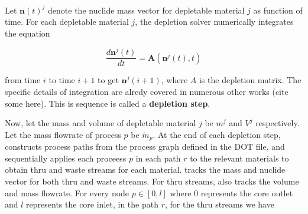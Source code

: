 Let $\mathbf{n}(t)^{j}$ denote the nuclide mass vector for depletable material
$j$ as function of time. For each depletable material $j$, the depletion
solver numerically integrates the equation

\begin{equation}
    \frac{d\mathbf{n}^{j}(t)}{dt} = \mathbf{A}(\mathbf{n}^{j}(t), t)
\end{equation}

from time $i$ to time $i+1$ to get $\mathbf{n}^{j}(i+1)$, where $A$ is the
depletion matrix. The specific details of integration are alredy covered in
numerous other works (cite some here). This is sequence is called a {\bf depletion step}.

Now, let the mass and volume of depletable material $j$ be
$m^{j}$ and $V^{j}$ respectively. Let the mass flowrate of process $p$ be
$\dot{m}_{p}$. At the end of each depletion step, \SaltProc constructs process
paths from the process graph defined in the DOT file, and sequentially applies
each proceess $p$ in each path $r$ to the relevant materials to obtain thru
and waste streams for each material. \SaltProc tracks the mass and nuclide vector for both thru and waste streams. For thru
streams, \SaltProc also tracks the volume and mass flowrate. For every node
$p\in[0,l]$ where $0$ represents the core outlet and $l$ represents the core
inlet, in the path $r$, for the thru streams we have

